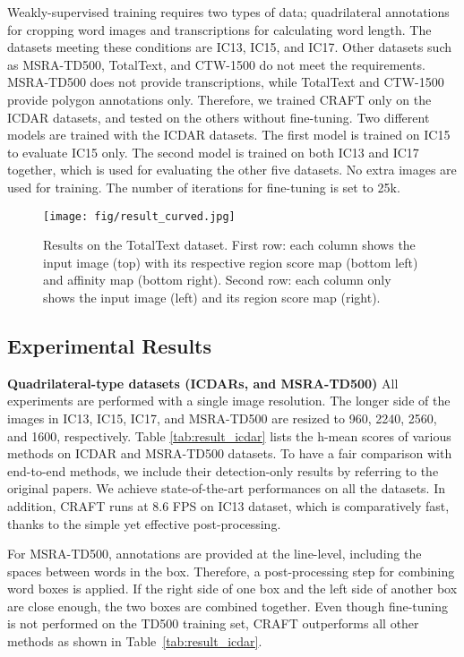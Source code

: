 \documentclass[10pt,twocolumn,letterpaper]{article}
\begin{document}
Weakly-supervised training requires two types of data; quadrilateral annotations for cropping word images and transcriptions for calculating word length. The datasets meeting these conditions are IC13, IC15, and IC17. Other datasets such as MSRA-TD500, TotalText, and CTW-1500 do not meet the requirements.
MSRA-TD500 does not provide transcriptions, while TotalText and CTW-1500 provide polygon annotations only. 
Therefore, we trained CRAFT only on the ICDAR datasets, and tested on the others without fine-tuning. Two different models are trained with the ICDAR datasets. The first model is trained on IC15 to evaluate IC15 only. The second model is trained on both IC13 and IC17 together, which is used for evaluating the other five datasets. No extra images are used for training. The number of iterations for fine-tuning is set to 25k.



\begin{figure*}[t]
  \centering
  \texttt{[image: fig/result\_curved.jpg]}
  \caption{Results on the TotalText dataset. First row: each column shows the input image (top) with its respective region score map (bottom left) and affinity map (bottom right). Second row: each column only shows the input image (left) and its region score map (right).}
\label{fig:result_curved} 
\end{figure*}



\subsection{Experimental Results}

\noindent\textbf{Quadrilateral-type datasets (ICDARs, and MSRA-TD500)} 
All experiments are performed with a single image resolution. The longer side of the images in IC13, IC15, IC17, and MSRA-TD500 are resized to 960, 2240, 2560, and 1600, respectively.
Table \ref{tab:result_icdar} lists the h-mean scores of various methods on ICDAR and MSRA-TD500 datasets.
To have a fair comparison with end-to-end methods, we include their detection-only results by referring to the original papers.
We achieve state-of-the-art performances on all the datasets. In addition, CRAFT runs at 8.6 FPS on IC13 dataset, which is comparatively fast, thanks to the simple yet effective post-processing.






For MSRA-TD500, annotations are provided at the line-level, including the spaces between words in the box. Therefore, a post-processing step for combining word boxes is applied. If the right side of one box and the left side of another box are close enough, the two boxes are combined together. Even though fine-tuning is not performed on the TD500 training set, CRAFT outperforms all other methods as shown in Table~\ref{tab:result_icdar}. 
\end{document}
